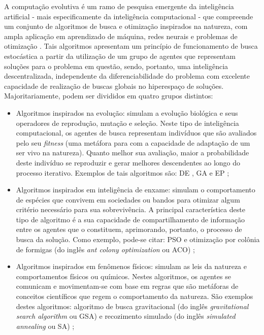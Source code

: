 \documentclass[
	12pt,				%
	openany,			%
	twoside,			%
	a4paper,			%
	chapter=TITLE,		%
	section=Title,		%
	subsection=Title,	%
	subsubsection=Title,%
	english,			%
	french,				%
	spanish,			%
	brazil			%
	]{abntex2}
\begin{document}
\begin{ERRATA}
A computação evolutiva é um ramo de pesquisa emergente da inteligência artificial - mais especificamente da inteligência computacional - que compreende um conjunto de algoritmos de busca e otimização inspirados na natureza, com ampla aplicação em aprendizado de máquina, redes neurais e problemas de otimização \cite{ec-ml, compint, rnn_evcomp}. Tais algoritmos apresentam um princípio de funcionamento de busca estocástica a partir da utilização de um grupo de agentes que representam soluções para o problema em questão, sendo, portanto, uma inteligência descentralizada, independente da diferenciabilidade do problema com excelente capacidade de realização de buscas globais no hiperespaço de soluções. Majoritariamente, podem ser divididos em quatro grupos distintos:

\begin{itemize}
    \item Algoritmos inspirados na evolução: simulam a evolução biológica e seus operadores de reprodução, mutação e seleção. Neste tipo de inteligência computacional, os agentes de busca representam indivíduos que são avaliados pelo seu \emph{fitness} (uma metáfora para com a capacidade de adaptação de um ser vivo na natureza). Quanto melhor sua avaliação, maior a probabilidade deste indivíduo se reproduzir e gerar melhores descendentes ao longo do processo iterativo. Exemplos de tais algoritmos são: DE \cite{de_}, GA \cite{ga_} e EP \cite{ep_};
    \item Algoritmos inspirados em inteligência de enxame: simulam o comportamento de espécies que convivem em sociedades ou bandos para otimizar algum critério necessário para sua sobrevivência. A principal característica deste tipo de algoritmo é a sua capacidade de compartilhamento de informação entre os agentes que o constituem, aprimorando, portanto, o processo de busca da solução. Como exemplo, pode-se citar: PSO \cite{pso_artigo} e otimização por colônia de formigas (do inglês \emph{ant colony optimization} ou ACO) \cite{aco};
    \item Algoritmos inspirados em fenômenos físicos: simulam as leis da natureza e comportamentos físicos ou químicos. Nestes algoritmos, os agentes se comunicam e movimentam-se com base em regras que são metáforas de conceitos científicos que regem o comportamento da natureza. São exemplos destes algoritmos: algoritmo de busca gravitacional (do inglês \emph{gravitational search algorithm} ou GSA) \cite{gsa} e recozimento simulado (do inglês \emph{simulated annealing} ou SA) \cite{Kirkpatrick1983OptimizationBS};
    

\end{itemize}
\end{ERRATA}
\end{document}

